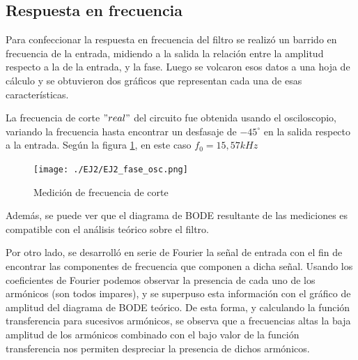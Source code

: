 \subsection{Respuesta en frecuencia}

\quad \quad Para confeccionar la respuesta en frecuencia del filtro se realiz\'o un barrido en frecuencia de la entrada, midiendo a la salida la relaci\'on entre la amplitud respecto a la de la entrada, y la fase. Luego se volcaron esos datos a una hoja de c\'alculo y se obtuvieron dos gr\'aficos que representan cada una de esas caracter\'isticas.




\quad \quad La frecuencia de corte $"real"$ del circuito fue obtenida usando el osciloscopio, variando la frecuencia hasta encontrar un desfasaje de $-45^\circ$ en la salida respecto a la entrada. Seg\'un la figura \ref{fig:phase_2}, en este caso $f_{0}=15,57kHz$


\begin{figure}[H]
    \centering
    \texttt{[image: ./EJ2/EJ2\_fase\_osc.png]}
    \caption{Medici\'on de frecuencia de corte}
    \label{fig:phase_2} 
\end{figure}
\quad \quad Adem\'as, se puede ver que el diagrama de BODE resultante de las mediciones es compatible con el an\'alisis te\'orico sobre el filtro.

\quad \quad Por otro lado, se desarroll\'o en serie de Fourier la se\~nal de entrada con el fin de encontrar las componentes de frecuencia que componen a dicha se\~nal. Usando los coeficientes de Fourier podemos observar la presencia de cada uno de los arm\'onicos (son todos impares), y se superpuso esta informaci\'on con el gr\'afico de amplitud del diagrama de BODE teórico. De esta forma, y calculando la funci\'on transferencia para sucesivos arm\'onicos, se observa que a frecuencias altas la baja amplitud de los arm\'onicos combinado con el bajo valor de la funci\'on transferencia nos permiten despreciar la presencia de dichos arm\'onicos.

